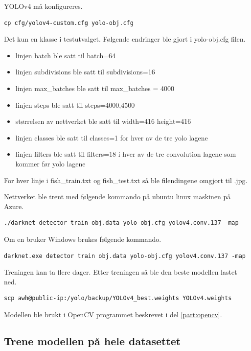 YOLOv4 må konfigureres.

\begin{verbatim}
cp cfg/yolov4-custom.cfg yolo-obj.cfg
\end{verbatim}

Det kun en klasse i testutvalget. Følgende endringer ble gjort i yolo-obj.cfg filen.

\begin{itemize}
  \item linjen batch ble satt til batch=64
  \item linjen subdivisions ble satt til subdivisions=16
  \item linjen max\_batches ble satt til max\_batches = 4000
  \item linjen steps ble satt til steps=4000,4500
  \item størrelsen av nettverket ble satt til width=416 height=416
  \item linjen classes ble satt til classes=1 for hver av de tre yolo lagene
  \item linjen filters ble satt til filters=18 i hver av de tre convolution lagene som kommer før yolo lagene
\end{itemize}

For hver linje i fish\_train.txt og fish\_test.txt så ble filendingene omgjort til .jpg.

Nettverket ble trent med følgende kommando på ubuntu linux maskinen på Azure.

\begin{verbatim}
./darknet detector train obj.data yolo-obj.cfg yolov4.conv.137 -map
\end{verbatim}

Om en bruker Windows brukes følgende kommando.

\begin{verbatim}
darknet.exe detector train obj.data yolo-obj.cfg yolov4.conv.137 -map
\end{verbatim}

Treningen kan ta flere dager. Etter treningen så ble den beste modellen lastet ned.

\begin{verbatim}
scp awh@public-ip:/yolo/backup/YOLOv4_best.weights YOLOv4.weights
\end{verbatim}

Modellen ble brukt i OpenCV programmet beskrevet i del \ref{part:opencv}. 

\subsection{Trene modellen på hele datasettet}

